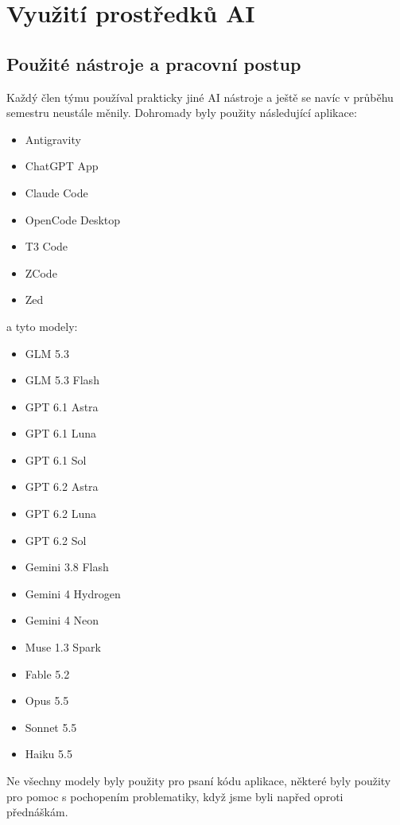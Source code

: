 \documentclass[11pt,a4paper]{article}
\begin{document}
\section{Využití prostředků AI}

\subsection{Použité nástroje a pracovní postup}
Každý člen týmu používal prakticky jiné AI nástroje a ještě se navíc v průběhu semestru neustále měnily. Dohromady byly použity následující aplikace:
\begin{itemize}
  \item Antigravity
  \item ChatGPT App
  \item Claude Code
  \item OpenCode Desktop
  \item T3 Code
  \item ZCode
  \item Zed
\end{itemize}
a tyto modely:
\begin{itemize}
  \item GLM 5.3
  \item GLM 5.3 Flash
  \item GPT 6.1 Astra
  \item GPT 6.1 Luna
  \item GPT 6.1 Sol
  \item GPT 6.2 Astra
  \item GPT 6.2 Luna
  \item GPT 6.2 Sol
  \item Gemini 3.8 Flash
  \item Gemini 4 Hydrogen
  \item Gemini 4 Neon
  \item Muse 1.3 Spark
  \item Fable 5.2
  \item Opus 5.5
  \item Sonnet 5.5
  \item Haiku 5.5
\end{itemize}
Ne všechny modely byly použity pro psaní kódu aplikace, některé byly použity pro pomoc s pochopením problematiky, když jsme byli napřed oproti přednáškám.
\end{document}
